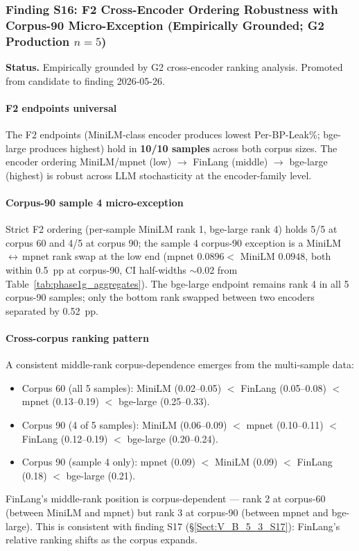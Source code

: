 \documentclass[journal]{IEEEtran}
\begin{document}
\subsubsection{Finding S16: F2 Cross-Encoder Ordering Robustness with Corpus-90 Micro-Exception (Empirically Grounded; G2 Production $n{=}5$)}
\label{Sect:V_B_5_2_S16}

\textbf{Status.} Empirically grounded by G2 cross-encoder ranking analysis. Promoted from candidate to finding 2026-05-26.

\paragraph{F2 endpoints universal}
The F2 endpoints (MiniLM-class encoder produces lowest Per-BP-Leak\%; bge-large produces highest) hold in \textbf{10/10 samples} across both corpus sizes. The encoder ordering MiniLM/mpnet (low) $\to$ FinLang (middle) $\to$ bge-large (highest) is robust across LLM stochasticity at the encoder-family level.

\paragraph{Corpus-90 sample 4 micro-exception}
Strict F2 ordering (per-sample MiniLM rank 1, bge-large rank 4) holds 5/5 at corpus 60 and 4/5 at corpus 90; the sample 4 corpus-90 exception is a MiniLM\,$\leftrightarrow$\,mpnet rank swap at the low end (mpnet $0.0896 <$ MiniLM $0.0948$, both within 0.5~pp at corpus-90, CI half-widths $\sim$0.02 from Table~\ref{tab:phase1g_aggregates}). The bge-large endpoint remains rank 4 in all 5 corpus-90 samples; only the bottom rank swapped between two encoders separated by 0.52~pp.

\paragraph{Cross-corpus ranking pattern}
A consistent middle-rank corpus-dependence emerges from the multi-sample data:
\begin{itemize}
\item Corpus 60 (all 5 samples): MiniLM (0.02--0.05) $<$ FinLang (0.05--0.08) $<$ mpnet (0.13--0.19) $<$ bge-large (0.25--0.33).
\item Corpus 90 (4 of 5 samples): MiniLM (0.06--0.09) $<$ mpnet (0.10--0.11) $<$ FinLang (0.12--0.19) $<$ bge-large (0.20--0.24).
\item Corpus 90 (sample 4 only): mpnet (0.09) $<$ MiniLM (0.09) $<$ FinLang (0.18) $<$ bge-large (0.21).
\end{itemize}
FinLang's middle-rank position is corpus-dependent --- rank 2 at corpus-60 (between MiniLM and mpnet) but rank 3 at corpus-90 (between mpnet and bge-large). This is consistent with finding S17 (\S\ref{Sect:V_B_5_3_S17}): FinLang's relative ranking shifts as the corpus expands.
\end{document}
